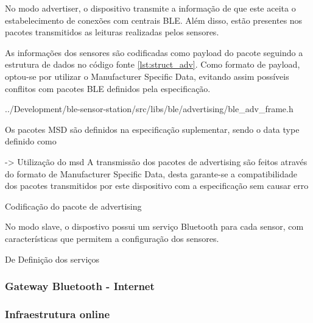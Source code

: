 No modo advertiser, o dispositivo transmite a informação de que este aceita o
estabelecimento de conexões com centrais BLE. Além disso, estão presentes nos
pacotes transmitidos as leituras realizadas pelos sensores.

As informações dos sensores são codificadas como payload do pacote seguindo a
estrutura de dados no código fonte \ref{lst:struct_adv}. Como formato de
payload, optou-se por utilizar o Manufacturer Specific Data, evitando assim
possíveis conflitos com pacotes BLE definidos pela especificação.


{../Development/ble-sensor-station/src/libs/ble/advertising/ble_adv_frame.h}

Os pacotes MSD são definidos na especificação suplementar, sendo o data type
definido como  

-> Utilização do msd
A transmissão dos pacotes de advertising são feitos através do formato de
Manufacturer Specific Data, desta garante-se a compatibilidade dos pacotes
transmitidos por este dispositivo com a especificação sem causar erro

Codificação do pacote de advertising

No modo slave, o dispostivo possui um serviço Bluetooth para cada sensor, com características que permitem a configuração dos sensores. 

De
Definição dos serviços



\subsubsection{Gateway Bluetooth - Internet}




\subsubsection{Infraestrutura online}


